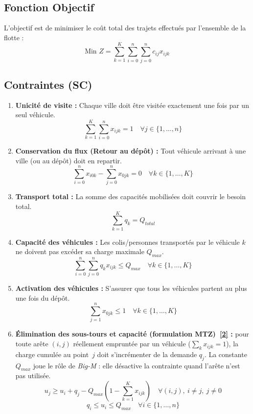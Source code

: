 \subsection{Fonction Objectif}

L'objectif est de minimiser le coût total des trajets effectués par l'ensemble de la flotte :
$$\text{Min } Z = \sum_{k=1}^{K} \sum_{i=0}^{n} \sum_{j=0}^{n} c_{ij} x_{ijk}$$

\subsection{Contraintes (SC)}

\begin{enumerate}
    \item \textbf{Unicité de visite :} Chaque ville doit être visitée exactement une fois par un seul véhicule.
    $$\sum_{k=1}^{K} \sum_{i=0}^{n} x_{ijk} = 1 \quad \forall j \in \{1, \dots, n\}$$

    \item \textbf{Conservation du flux (Retour au dépôt) :} Tout véhicule arrivant à une ville (ou au dépôt) doit en repartir.
    $$\sum_{i=0}^{n} x_{i0k} - \sum_{j=0}^{n} x_{0jk} = 0 \quad \forall k \in \{1, \dots, K\}$$

    \item \textbf{Transport total :} La somme des capacités mobilisées doit couvrir le besoin total.
    $$\sum_{k=1}^{K} q_k = Q_{total}$$

    \item \textbf{Capacité des véhicules :} Les colis/personnes transportés par le véhicule $k$ ne doivent pas excéder sa charge maximale $Q_{max}$.
    $$\sum_{i=0}^{n} \sum_{j=0}^{n} q_k x_{ijk} \leq Q_{max} \quad \forall k \in \{1, \dots, K\}$$

    \item \textbf{Activation des véhicules :} S'assurer que tous les véhicules partent au plus une fois du dépôt.
    $$\sum_{j=1}^{n} x_{0jk} \leq 1 \quad \forall k \in \{1, \dots, K\}$$

    \item \textbf{Élimination des sous-tours et capacité (formulation MTZ)~\hyperlink{ref:mtz1960}{[2]} :} pour toute arête $(i,j)$ réellement empruntée par un véhicule ($\sum_{k} x_{ijk} = 1$), la charge cumulée au point~$j$ doit s'incrémenter de la demande $q_j$. La constante $Q_{max}$ joue le rôle de \textit{Big-M} : elle désactive la contrainte quand l'arête n'est pas utilisée.
    $$u_j \geq u_i + q_j - Q_{max}\left(1 - \sum_{k=1}^{K} x_{ijk}\right) \quad \forall (i,j),\ i \neq j,\ j \neq 0$$
    $$q_i \leq u_i \leq Q_{max} \quad \forall i \in \{1, \dots, n\}$$
\end{enumerate}

